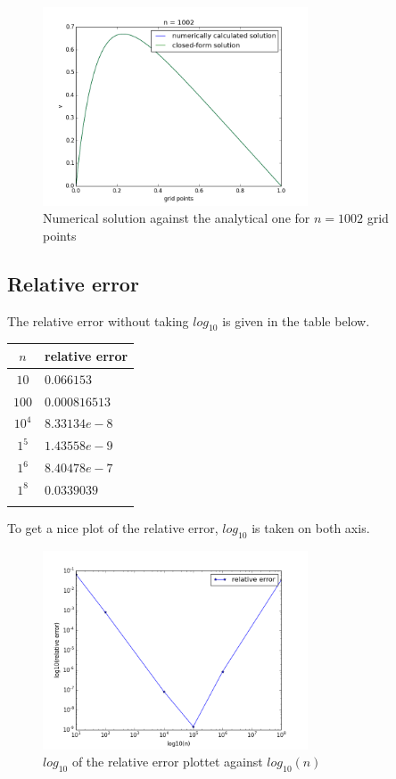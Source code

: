 \documentclass[a4paper,norsk,12pt,oneside]{article}
\begin{document}
 \begin{figure}[H]
            \centering %
            \includegraphics[width=0.7\textwidth]{blabla_1002.png}
            \caption{Numerical solution against the analytical one for \(n = 1002\) grid points} 
            \end{figure}  

\subsection{Relative error}

The relative error without taking \(log_{10}\)
is given in the table below. 

\begin{tabular}{c | l  }
    \label{pos_mikro}
    \(n\) & relative error \\ \hline
    \(10\) & \(0.066153\) \\ 
    \(100\) & \(0.000816513\)\\
    \(10^4\) & \(8.33134 e-8\)\\
    \(1^5\) & \(1.43558 e-9\)\\
    \(1^6\) & \(8.40478 e-7\)\\
    \(1^8\) & \(0.0339039\) \\\\
    \end{tabular} 

To get a nice plot of the relative error, \(log_{10}\) is taken on both axis.

\begin{figure}[H]
    \label{fig_error}
    \centering %
    \includegraphics[width=0.7\textwidth]{relative_error.png}
    \caption{\(log_{10}\) of the relative error plottet against \(log_{10}(n)\) } 
    \end{figure} 
\end{document}

